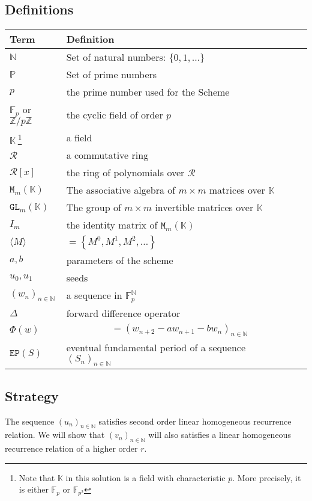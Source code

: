 \documentclass[]{article}
\begin{document}
\subsection{Definitions}
\begin{tabularx}{0.8\textwidth} { 
		| >{\raggedright\arraybackslash}X 
		| >{\centering\arraybackslash}X 
		| >{\raggedleft\arraybackslash}X | }
	\hline
	Term & Definition \\
	\hline
	$\mathbb{N}$ & Set of natural numbers: $\{0,1,\dots\}$  \\
	\hline
	
	$\mathbb{P}$ & Set of prime numbers  \\
	\hline
	$p$ & the prime number used for the Scheme  \\
	\hline
	$\mathbb{F}_p$  or $\mathbb{Z}/p\mathbb{Z}$ & the cyclic field of order $p$  \\
	\hline
	$\mathbb{K} \ $\footnote{Note that $\mathbb{K}$ in this solution is a field with characteristic $p.$ More precisely, it is either $\mathbb{F}_p$ or $\mathbb{F}_{p^2}$} & a field  \\
	\hline
	$\mathcal{R}$ & a commutative ring  \\
	\hline
	$\mathcal{R}[x]$ & the ring of polynomials over $\mathcal{R}$  \\
	\hline
	$\mathtt{M}_m(\mathbb{K})$ & The associative algebra of $m\times m$ matrices over $\mathbb{K}$  \\
	\hline
	$\mathtt{GL}_m(\mathbb{K})$ & The group of $m\times m$ invertible matrices over $\mathbb{K}$  \\
	\hline
	$I_m$ & the identity matrix of 	$\mathtt{M}_m(\mathbb{K})$ \\
	\hline
		$\langle  M \rangle$ & $=\left\{M^0,M^1,M^2,\dots\right\}$\\
	\hline
	$a,b$ & parameters of the scheme \\
	\hline
	$u_0,u_1$ & seeds \\
	\hline
	$(w_n)_{n\in\mathbb{N}}$ & a sequence in $\mathbb{F}_p^{\mathbb{N}}$ \\
	\hline
	$\Delta$ & forward difference operator \\
	\hline 
	$\Phi(w)$ & $$ =(w_{n+2}-aw_{n+1}-bw_n)_{n\in\mathbb{N}}$$\\
	\hline
	$\mathtt{EP}(S)$ & eventual fundamental period of a sequence $(S_n)_{n\in\mathbb{N}}$  \\
	\hline
\end{tabularx}
\subsection{Strategy}
The sequence $(u_n)_{n\in\mathbb{N}}$ satisfies second order linear homogeneous recurrence relation.
\newline
We will show that $(v_n)_{n\in\mathbb{N}}$ will also satisfies a linear homogeneous recurrence relation of a higher order $r$.
\end{document}
